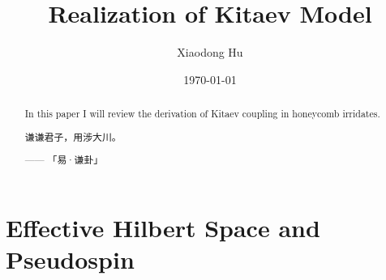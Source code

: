 \documentclass[10pt,nofootinbib]{revtex4}
\begin{document}
\title{Realization of Kitaev Model}
\author{Xiaodong Hu}

\date{\today}

\begin{abstract}
	In this paper I will review the derivation of Kitaev coupling in honeycomb irridates. \par
		\hfill\par
		{\centering\kaishu 谦谦君子，用涉大川。\par}
	\hfill------ 「易·谦卦」
\end{abstract}

\maketitle
\tableofcontents

\section{Effective Hilbert Space and Pseudospin}
\end{document}
